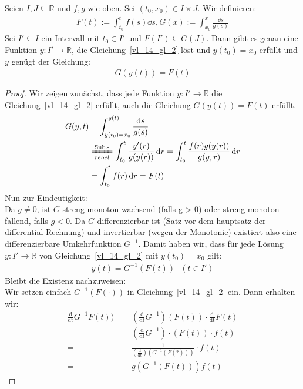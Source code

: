 \begin{Satz}{\label{vl_14_satz_1}
	Seien $I, J \subseteq \mathbb{R}$ und $f,g$ wie oben. 
	Sei $(t_0, x_0) \in I \times J$.
	Wir definieren:
	\begin{align*}
		F(t) := \int_{t_0}^t f(s)\dd{s}, G(x) := \int_{x_0}^x \frac{\dd{s}}{g(s)}
	\end{align*}
	Sei $I' \subseteq I$ ein Intervall mit $t_0 \in I'$ und 
	$F(I') \subseteq G(J)$.
	Dann gibt es genau eine Funktion $y : I' \rightarrow \mathbb{R}$, die 
	Gleichung~\ref{vl_14_gl_2} löst und $y(t_0) = x_0$ erfüllt und $y$ genügt der 
	Gleichung:
	\begin{align*}
		G(y(t)) = F(t)
	\end{align*}
}\end{Satz}
\begin{proof}
	Wir zeigen zunächst, dass jede Funktion $y: I' \rightarrow \mathbb{R}$ die 
	Gleichung~\ref{vl_14_gl_2} erfüllt, auch die Gleichung $G(y(t)) = F(t)$ erfüllt.
	\begin{align*}
		G(y,t) & =  \int_{y(t_0) = x_0}^{y(t)}\frac{\dd{s}}{g(s)} \\
		& \xlongequal[regel]{\text{Sub.-}} 
		\int_{t_0}^t\frac{y'(r)}{g(y(r))}\dd{r}
		= \int_{t_0}^t\frac{f(r)g(y(r))}{g(y,r)}\dd{r} \\
		& = \int_{t_0}^t f(r) \dd{r} = F(t)
	\end{align*}
	Nun zur Eindeutigkeit:\\
	Da $g \neq 0$, ist $G$ streng monoton wachsend (falls g > 0) oder streng monoton 
	fallend, falls $g < 0$. Da $G$ differenzierbar ist (Satz vor dem hauptsatz der 
	differential Rechnung)
	und invertierbar (wegen der Monotonie) existiert also eine differenzierbare 
	Umkehrfunktion $G^{-1}$. Damit haben wir, dass für jede Lösung 
	$y : I' \rightarrow \mathbb{R}$ von Gleichung~\ref{vl_14_gl_2} mit 
	$y(t_0) = x_0$ gilt:
	\begin{align*}
		y(t) = G^{-1}(F(t)) \text{ } (t \in I')
	\end{align*}
	Bleibt die Existenz nachzuweisen:\\
	Wir setzen einfach $G^{-1}(F(\cdot))$ in Gleichung~\ref{vl_14_gl_2} ein.
	Dann erhalten wir:
	\begin{align*}
		\frac{\mathrm{d}}{\mathrm{dt}} G^{-1}F(t)) 
		= & \left( \frac{\mathrm{d}}{\mathrm{dt}} G^{-1}\right) 
			(F(t)) \cdot \frac{\mathrm{d}}{\mathrm{dt}} F(t) \\
		= & \left(\frac{\mathrm{d}}{\mathrm{dt}}G^{-1}\right)\cdot (F(t)) \cdot f(t)
			\\
		= & \frac{1}{\left(\frac{\mathrm{d}}{\mathrm{dt}}\right)
			\left(G^{-1}(F(*))\right)} \cdot f(t) \\
		= & g\left(G^{-1}(F(t))\right)f(t)
	\end{align*}
\end{proof}

